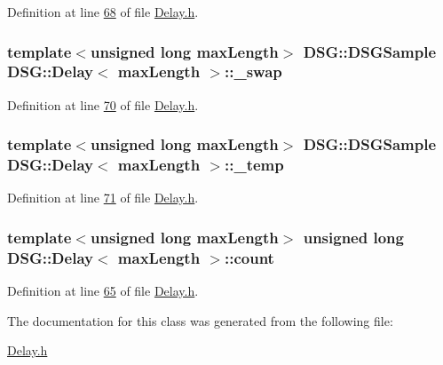 Definition at line \hyperlink{_delay_8h_source_l00068}{68} of file \hyperlink{_delay_8h_source}{Delay.\+h}.

\hypertarget{class_d_s_g_1_1_delay_af026ee90120c5cea6a935aef6cab6624}{
\subsubsection[{\+\_\+swap}]{\setlength{\rightskip}{0pt plus 5cm}template$<$unsigned long max\+Length$>$ {\bf D\+S\+G\+::\+D\+S\+G\+Sample} {\bf D\+S\+G\+::\+Delay}$<$ max\+Length $>$\+::\+\_\+swap\hspace{0.3cm}{\ttfamily [protected]}}}\label{class_d_s_g_1_1_delay_af026ee90120c5cea6a935aef6cab6624}


Definition at line \hyperlink{_delay_8h_source_l00070}{70} of file \hyperlink{_delay_8h_source}{Delay.\+h}.

\hypertarget{class_d_s_g_1_1_delay_a039bb7a3a39aff5841b9e808cacc1a6e}{
\subsubsection[{\+\_\+temp}]{\setlength{\rightskip}{0pt plus 5cm}template$<$unsigned long max\+Length$>$ {\bf D\+S\+G\+::\+D\+S\+G\+Sample} {\bf D\+S\+G\+::\+Delay}$<$ max\+Length $>$\+::\+\_\+temp\hspace{0.3cm}{\ttfamily [protected]}}}\label{class_d_s_g_1_1_delay_a039bb7a3a39aff5841b9e808cacc1a6e}


Definition at line \hyperlink{_delay_8h_source_l00071}{71} of file \hyperlink{_delay_8h_source}{Delay.\+h}.

\hypertarget{class_d_s_g_1_1_delay_a1d54836950db9724434880d859d1e3ea}{
\subsubsection[{count}]{\setlength{\rightskip}{0pt plus 5cm}template$<$unsigned long max\+Length$>$ unsigned long {\bf D\+S\+G\+::\+Delay}$<$ max\+Length $>$\+::count\hspace{0.3cm}{\ttfamily [protected]}}}\label{class_d_s_g_1_1_delay_a1d54836950db9724434880d859d1e3ea}


Definition at line \hyperlink{_delay_8h_source_l00065}{65} of file \hyperlink{_delay_8h_source}{Delay.\+h}.



The documentation for this class was generated from the following file\+:\begin{DoxyCompactItemize}
\item 
\hyperlink{_delay_8h}{Delay.\+h}\end{DoxyCompactItemize}
